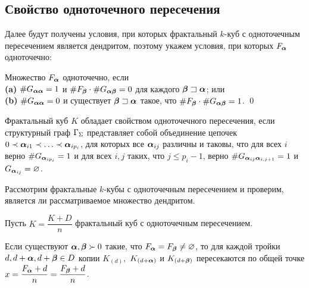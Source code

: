 \subsection{Свойство одноточечного пересечения}

Далее будут получены условия, при которых фрактальный $k$-куб с одноточечным пересечением является дендритом, поэтому укажем условия, при которых $F_{\bm{\alpha}}$ одноточечно:

\begin{corollary}\label{onepoint} 
Множество $F_{\bm{\alpha}}$ одноточечно, если \\
\textbf{(a)} $\#G_{{\bm{\alpha}}{\bm{\alpha}}}=1$ и $\#F_{\bm{\beta}}\cdot\#G_{{\bm{\alpha}}{\bm{\beta}}}=0$ для каждого ${\bm{\beta}}\sqsupset{\bm{\alpha}}$; или\\
\textbf{(b)} $\#G_{{\bm{\alpha}}{\bm{\alpha}}}=0$ и существует ${\bm{\beta}}\sqsupset{\bm{\alpha}}$ такое, что $\#F_{\bm{\beta}}\cdot\#G_{{\bm{\alpha}}{\bm{\beta}}}=1$.
\hfill\qed
\end{corollary}

\begin{corollary}
Фрактальный куб $K$ обладает свойством одноточечного пересечения, если структурный граф $\Gamma_\Sigma$ представляет собой объединение цепочек $0\prec{\bm{\alpha}}_{i1}\prec\ldots\prec{\bm{\alpha}}_{ip_i}$, для которых все ${\bm{\alpha}}_{ij}$ различны и таковы, что для всех $i$ верно $\#G_{{\bm{\alpha}}_{ip_i}}=1$ и для всех $i,j$ таких, что $j\le p_i-1$, верно $\# G_{{\bm{\alpha}}_{ij}{\bm{\alpha}}_{i,j+1}}=1$ и $G_{{\bm{\alpha}}_{ij}}=\varnothing$.
\end{corollary}

Рассмотрим фрактальные $k$-кубы с одноточечным пересечением и проверим, является ли рассматриваемое множество дендритом.

\begin{theorem}
Пусть $K=\dfrac{K+D}{n}$ фрактальный куб с одноточечным пересечением. 

Если существуют ${\bm{\alpha}},{\bm{\beta}}\succ0$ такие, что $F_{\bm{\alpha}}=F_{\bm{\beta}}\neq\varnothing$,  то для каждой тройки $d, d+{\bm{\alpha}}, d+{\bm{\beta}}\in D$ копии $K_{(d)},$ $K_{(d+{\bm{\alpha}})}$ и $K_{(d+{\bm{\beta}})}$ пересекаются по общей точке $x=\dfrac{F_{\bm{\alpha}}+d}{n}=\dfrac{F_{\bm{\beta}}+d}{n}$.
\end{theorem}

